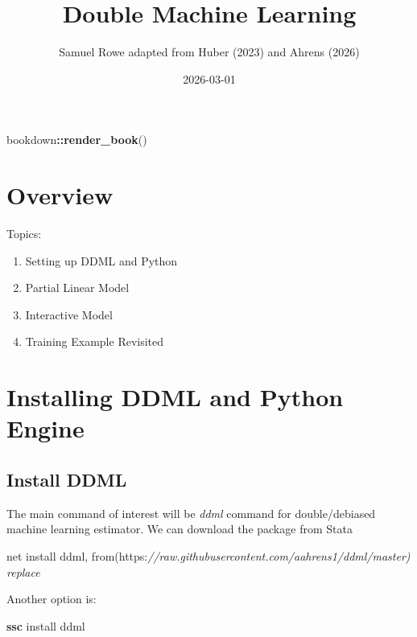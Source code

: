 \documentclass[
]{book}
\title{Double Machine Learning}
\author{Samuel Rowe adapted from Huber (2023) and Ahrens (2026)}
\date{2026-03-01}
\newenvironment{Shaded}{\begin{snugshade}}{\end{snugshade}}
\newcommand{\CommentTok}[1]{\textcolor[rgb]{0.56,0.35,0.01}{\textit{#1}}}
\newcommand{\FunctionTok}[1]{\textcolor[rgb]{0.13,0.29,0.53}{\textbf{#1}}}
\newcommand{\KeywordTok}[1]{\textcolor[rgb]{0.13,0.29,0.53}{\textbf{#1}}}
\newcommand{\NormalTok}[1]{#1}
\newcommand{\SpecialCharTok}[1]{\textcolor[rgb]{0.81,0.36,0.00}{\textbf{#1}}}
\providecommand{\tightlist}{%
  \setlength{\itemsep}{0pt}\setlength{\parskip}{0pt}}
\begin{document}
\maketitle

{
\setcounter{tocdepth}{1}
\tableofcontents
}
\begin{Shaded}
\begin{Highlighting}[]
\NormalTok{bookdown}\SpecialCharTok{::}\FunctionTok{render\_book}\NormalTok{()}
\end{Highlighting}
\end{Shaded}

\chapter*{Overview}\label{overview}

Topics:

\begin{enumerate}
\def\labelenumi{\arabic{enumi}.}
\tightlist
\item
  Setting up DDML and Python
\item
  Partial Linear Model
\item
  Interactive Model
\item
  Training Example Revisited
\end{enumerate}

\chapter{Installing DDML and Python Engine}\label{installing-ddml-and-python-engine}

\section{Install DDML}\label{install-ddml}

The main command of interest will be \emph{ddml} command for double/debiased machine learning estimator. We can download the package from Stata

\begin{Shaded}
\begin{Highlighting}[]
\NormalTok{net install ddml, from(https:}\CommentTok{//raw.githubusercontent.com/aahrens1/ddml/master) replace}
\end{Highlighting}
\end{Shaded}

Another option is:

\begin{Shaded}
\begin{Highlighting}[]
\KeywordTok{ssc}\NormalTok{ install ddml}
\end{Highlighting}
\end{Shaded}
\end{document}
